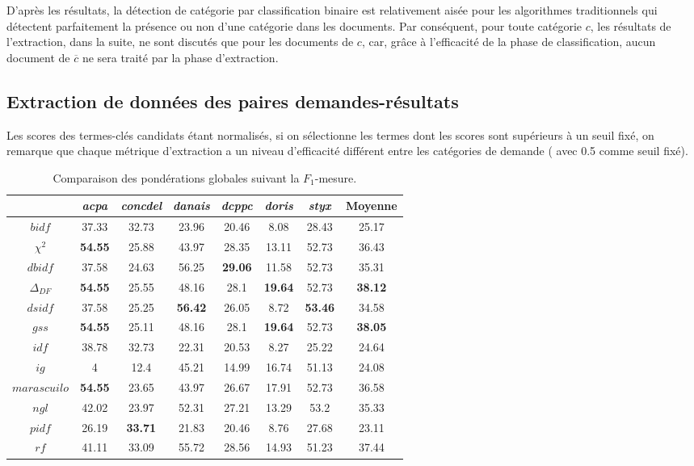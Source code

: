 D'après les résultats, la détection de catégorie par classification binaire est relativement aisée pour les algorithmes traditionnels qui détectent parfaitement la présence ou non d'une catégorie dans les documents. Par conséquent, pour toute catégorie $c$, les résultats de l'extraction, dans la suite, ne sont discutés que pour les documents de $c$, car, grâce à l'efficacité de la phase de classification, aucun document de $\overline{c}$ ne sera traité par la phase d'extraction.

\subsection{Extraction de données des paires demandes-résultats}
Les scores des termes-clés candidats étant normalisés, si on sélectionne les termes dont les scores sont supérieurs à un seuil fixé, on remarque que chaque métrique d'extraction a un niveau d'efficacité différent entre les catégories de demande ( avec 0.5 comme seuil fixé). 

\begin{table}[!htb]
	\centering \small
	\begin{tabular}{|c|c|c|c|c|c|c|c|}
		\hline
		& \textit{acpa} & \textit{concdel} & \textit{danais} & \textit{dcppc} & \textit{doris} & \textit{styx} & \textbf{Moyenne} \\ \hline
		$bidf$ & 37.33 & 32.73 & 23.96 & 20.46 & 8.08 & 28.43 & 25.17 \\ \hline
		$\chi^2$ & \textbf{54.55} & 25.88 & 43.97 & 28.35 & 13.11 & 52.73 & 36.43 \\ \hline
		$dbidf$ & 37.58 & 24.63 & 56.25 & \textbf{29.06} & 11.58 & 52.73 & 35.31 \\ \hline
		$\Delta_{DF}$ & \textbf{54.55} & 25.55 & 48.16 & 28.1 & \textbf{19.64} & 52.73 & \textbf{38.12} \\ \hline
		$dsidf$ & 37.58 & 25.25 & \textbf{56.42} & 26.05 & 8.72 & \textbf{53.46} & 34.58 \\ \hline
		$gss$ & \textbf{54.55} & 25.11 & 48.16 & 28.1 & \textbf{19.64} & 52.73 & \textbf{38.05} \\ \hline
		$idf$ & 38.78 & 32.73 & 22.31 & 20.53 & 8.27 & 25.22 & 24.64 \\ \hline
		$ig$ & 4 & 12.4 & 45.21 & 14.99 & 16.74 & 51.13 & 24.08 \\ \hline
		$marascuilo$ & \textbf{54.55} & 23.65 & 43.97 & 26.67 & 17.91 & 52.73 & 36.58 \\ \hline
		$ngl$ & 42.02 & 23.97 & 52.31 & 27.21 & 13.29 & 53.2 & 35.33 \\ \hline
		$pidf$ & 26.19 & \textbf{33.71} & 21.83 & 20.46 & 8.76 & 27.68 & 23.11 \\ \hline
		$rf$ & 41.11 & 33.09 & 55.72 & 28.56 & 14.93 & 51.23 & 37.44 \\ \hline
	\end{tabular}
\caption{Comparaison des pondérations globales suivant la $F_1$-mesure.} \label{tab:quanta:compareGW}
\end{table}


